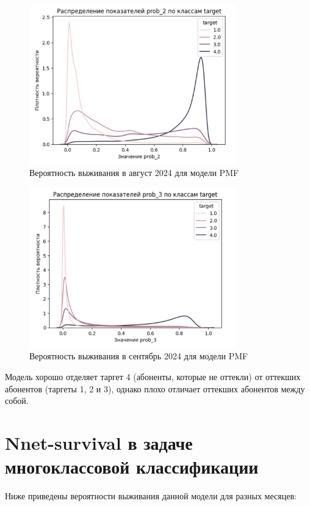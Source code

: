 \documentclass[a4paper,14pt,oneside,openany]{memoir}
\begin{document}
\begin{figure}[H]
	\includegraphics[width=0.8\textwidth]{../figures/prob_2_pmf.png}
	\caption{Вероятность выживания в август 2024 для модели PMF}
\end{figure}

\begin{figure}[H]
	\includegraphics[width=0.8\textwidth]{../figures/prob_3_pmf.png}
	\caption{Вероятность выживания в сентябрь 2024 для модели PMF}
\end{figure}

Модель хорошо отделяет таргет 4 (абоненты, которые не оттекли) от оттекших абонентов (таргеты 1, 2 и 3), однако плохо отличает оттекших абонентов между собой. 

\section{Nnet-survival в задаче многоклассовой классификации}

Ниже приведены вероятности выживания данной модели для разных месяцев: 
\end{document}
